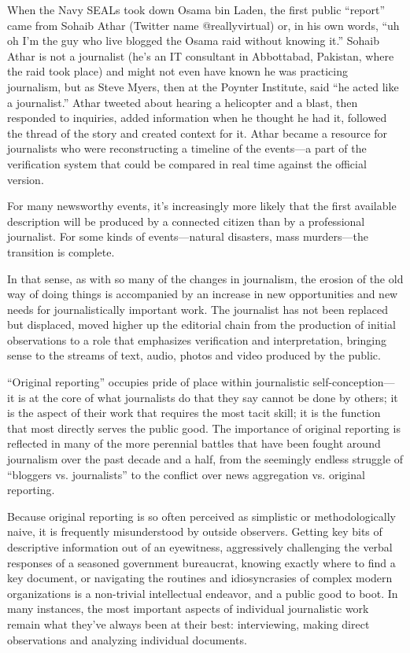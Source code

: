 When the Navy SEALs took down Osama bin Laden, the first public ``report''
came from Sohaib Athar (Twitter name @reallyvirtual) or, in his own words, ``uh
oh I’m the guy who live blogged the Osama raid without knowing it.'' Sohaib
Athar is not a journalist (he’s an IT consultant in Abbottabad, Pakistan, where the
raid took place) and might not even have known he was practicing journalism,
but as Steve Myers, then at the Poynter Institute, said ``he acted like a journalist.''
Athar tweeted about hearing a helicopter and a blast, then responded to inquiries,
added information when he thought he had it, followed the thread of the story
and created context for it. Athar became a resource for journalists who were
reconstructing a timeline of the events—a part of the verification system that
could be compared in real time against the official version.

For many newsworthy events, it’s increasingly more likely that the first available
description will be produced by a connected citizen than by a professional journalist.
For some kinds of events—natural disasters, mass murders—the transition
is complete.

In that sense, as with so many of the changes in journalism, the erosion of the old
way of doing things is accompanied by an increase in new opportunities and new
needs for journalistically important work. The journalist has not been replaced
but displaced, moved higher up the editorial chain from the production of initial
observations to a role that emphasizes verification and interpretation, bringing
sense to the streams of text, audio, photos and video produced by the public.

``Original reporting'' occupies pride of place within journalistic self-conception—
it is at the core of what journalists do that they say cannot be done by
others; it is the aspect of their work that requires the most tacit skill; it is the
function that most directly serves the public good. The importance of original
reporting is reflected in many of the more perennial battles that have been fought
around journalism over the past decade and a half, from the seemingly endless
struggle of ``bloggers vs. journalists'' to the conflict over news aggregation vs.
original reporting.

Because original reporting is so often perceived as simplistic or methodologically
naive, it is frequently misunderstood by outside observers. Getting key bits of
descriptive information out of an eyewitness, aggressively challenging the verbal
responses of a seasoned government bureaucrat, knowing exactly where to
find a key document, or navigating the routines and idiosyncrasies of complex
modern organizations is a non-trivial intellectual endeavor, and a public good
to boot. In many instances, the most important aspects of individual journalistic
work remain what they’ve always been at their best: interviewing, making direct
observations and analyzing individual documents.


